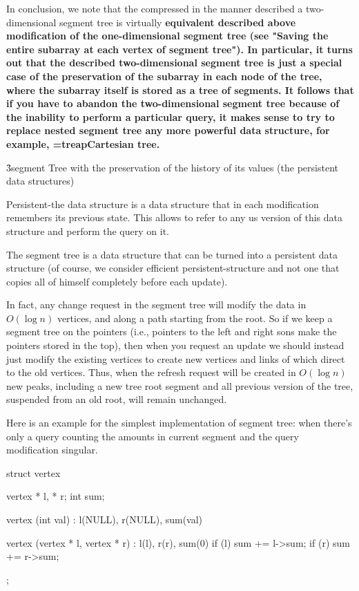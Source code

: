 In conclusion, we note that the compressed in the manner described a two-dimensional segment tree is virtually \bf{equivalent} described above modification of the one-dimensional segment tree (see "Saving the entire subarray at each vertex of segment tree"). In particular, it turns out that the described two-dimensional segment tree is just a special case of the preservation of the subarray in each node of the tree, where the subarray itself is stored as a tree of segments. It follows that if you have to abandon the two-dimensional segment tree because of the inability to perform a particular query, it makes sense to try to replace nested segment tree any more powerful data structure, for example, \algohref=treap{Cartesian tree}.


\h3{segment Tree with the preservation of the history of its values (the persistent data structures)}

Persistent-the data structure is a data structure that in each modification remembers its previous state. This allows to refer to any us version of this data structure and perform the query on it.

The segment tree is a data structure that can be turned into a persistent data structure (of course, we consider efficient persistent-structure and not one that copies all of himself completely before each update).

In fact, any change request in the segment tree will modify the data in $O (\log n)$ vertices, and along a path starting from the root. So if we keep a segment tree on the pointers (i.e., pointers to the left and right sons make the pointers stored in the top), then when you request an update we should instead just modify the existing vertices to create new vertices and links of which direct to the old vertices. Thus, when the refresh request will be created in $O (\log n)$ new peaks, including a new tree root segment and all previous version of the tree, suspended from an old root, will remain unchanged.

Here is an example for the simplest implementation of segment tree: when there's only a query counting the amounts in current segment and the query modification singular.

\code
struct vertex {
vertex * l, * r;
int sum;

vertex (int val)
: l(NULL), r(NULL), sum(val)
{ }

vertex (vertex * l, vertex * r)
: l(l), r(r), sum(0)
{
if (l) sum += l->sum;
if (r) sum += r->sum;
}
};

